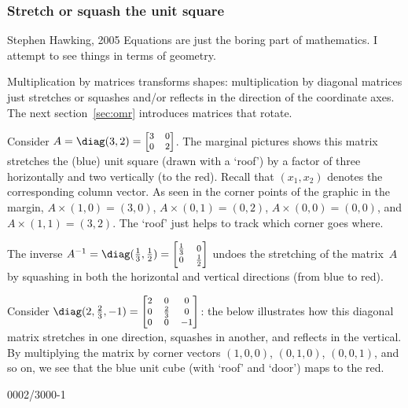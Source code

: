 \subsubsection{Stretch or squash the unit square}

\begin{quoted}{Stephen Hawking, 2005}
Equations are just the boring part of mathematics.  
I attempt to see things in terms of geometry.
\end{quoted}


Multiplication by matrices transforms shapes:
multiplication by diagonal matrices just stretches or squashes and/or reflects in the direction of the coordinate axes.
The next section~\ref{sec:omr} introduces matrices that rotate.




\begin{example} \label{eg:}
Consider \(A=\diag(3,2)=\footnotesize\begin{bmatrix} 3&0\\0&2 \end{bmatrix}\). 
%
The marginal pictures shows this matrix stretches the (blue) unit square (drawn with a `roof') by a factor of three horizontally and two vertically (to the red). 
Recall that \((x_1,x_2)\) denotes the corresponding column vector.  
As seen in the corner points of the graphic in the margin,  \(A\times(1,0)=(3,0)\), \(A\times(0,1)=(0,2)\), \(A\times(0,0)=(0,0)\),  and \(A\times(1,1)=(3,2)\).   
The `roof' just helps to track which corner goes where.

%
The inverse \(A^{-1}=\diag(\frac13,\frac12)=\footnotesize\begin{bmatrix} \frac13&0\\0&\frac12 \end{bmatrix}\) undoes the stretching of the matrix~\(A\) by squashing in both the horizontal and vertical directions (from blue to red).  
\end{example}




\begin{example} \label{eg:}
Consider \(\diag(2,\frac23,-1)=\footnotesize\begin{bmatrix} 2&0&0\\0&\frac23&0\\0&0&-1 \end{bmatrix}\): 
the  below illustrates how this diagonal matrix stretches in one direction, squashes in another, and reflects in the vertical.  
By multiplying the matrix by corner vectors \((1,0,0)\), \((0,1,0)\), \((0,0,1)\), and so on, we see that the blue unit cube (with `roof' and `door') maps to the red.
\begin{center}
\def\unithousesize{small}
000{2/3}000{-1}
\end{center}
\end{example}

